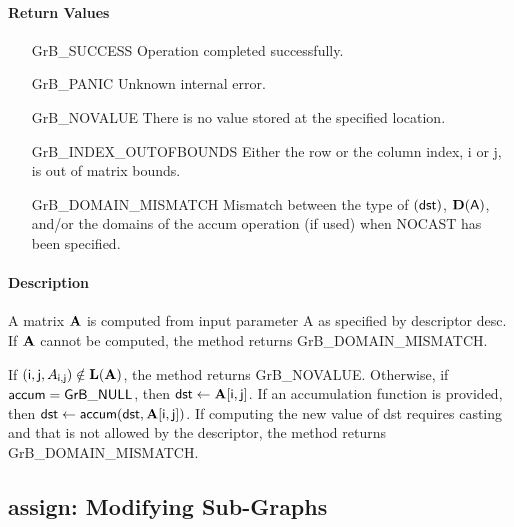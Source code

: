 \paragraph{Return Values}

\begin{itemize}[leftmargin=2.1in]
\item[{\sf GrB\_SUCCESS}]             Operation completed successfully.
\item[{\sf GrB\_PANIC}]               Unknown internal error.
\item[{\sf GrB\_NOVALUE}]             There is no value stored at the specified location.
\item[{\sf GrB\_INDEX\_OUTOFBOUNDS}]  Either the row or the column index,
                                      {\sf i} or {\sf j}, is out of matrix bounds.
\item[{\sf GrB\_DOMAIN\_MISMATCH}]    Mismatch between the type of $(\sf dst)$, 
                                      $\bold{D}({\sf A})$, and/or the domains of the 
                                      {\sf accum} operation (if used) when {\sf NOCAST} has
                                      been specified.
\end{itemize}

\paragraph{Description}

A matrix ${\bf A}$ is computed from input parameter {\sf A} as specified by descriptor {\sf desc}.
If ${\bf A}$ cannot be computed, the method returns {\sf GrB\_DOMAIN\_MISMATCH}.

If $({\sf i},{\sf j}, A_{{\sf i},{\sf j}}) \notin \bold{L}({\bf A})$, 
the method returns {\sf GrB\_NOVALUE}.  Otherwise, if 
${\sf accum} = {\sf GrB\_NULL}$, then ${\sf dst} \leftarrow {\bf A}[{\sf i},{\sf j}]$.
If an accumulation function is provided, then 
${\sf dst} \leftarrow {\sf accum}({\sf dst},{\bf A}[{\sf i},{\sf j}])$.
If computing the new value of {\sf dst} requires casting and that is not allowed 
by the descriptor, the method returns {\sf GrB\_DOMAIN\_MISMATCH}.

\subsection{{\sf assign}: Modifying Sub-Graphs}


